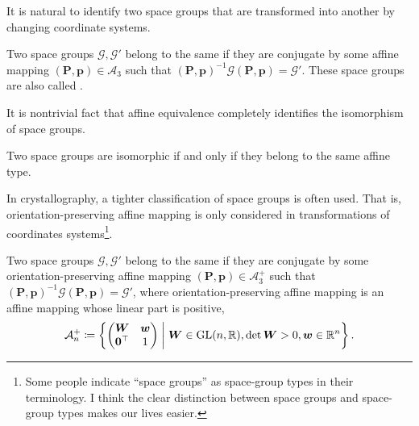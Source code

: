 It is natural to identify two space groups that are transformed into another by changing coordinate systems.

\begin{screen}
  \begin{defn}
    Two space groups $\mathcal{G}, \mathcal{G}'$ belong to the same  if they are conjugate by some affine mapping $(\bm{P}, \bm{p}) \in \mathcal{A}_{3}$ such that $(\bm{P}, \bm{p})^{-1} \mathcal{G} (\bm{P}, \bm{p}) = \mathcal{G}'$.
    These space groups are also called .
  \end{defn}
\end{screen}

It is nontrivial fact that affine equivalence completely identifies the isomorphism of space groups.

\begin{screen}
  \begin{them}[Bieberbach]
    Two space groups are isomorphic if and only if they belong to the same affine type.
  \end{them}
\end{screen}

In crystallography, a tighter classification of space groups is often used.
That is, orientation-preserving affine mapping is only considered in transformations of coordinates systems\footnote{
  Some people indicate ``space groups'' as space-group types in their terminology.
  I think the clear distinction between space groups and space-group types makes our lives easier.
}.

\begin{screen}
  \begin{defn}
    Two space groups $\mathcal{G}, \mathcal{G}'$ belong to the same  if they are conjugate by some orientation-preserving affine mapping $(\bm{P}, \bm{p}) \in \mathcal{A}^{+}_{3}$ such that $(\bm{P}, \bm{p})^{-1} \mathcal{G} (\bm{P}, \bm{p}) = \mathcal{G}'$, where orientation-preserving affine mapping is an affine mapping whose linear part is positive,
    \begin{align}
      \mathcal{A}^{+}_{n} \coloneqq \left\{  \begin{pmatrix} \bm{W} & \bm{w} \\ \bm{0}^{\top} & 1 \end{pmatrix}  \mathrel{}\middle|\mathrel{}  \bm{W} \in \mathrm{GL}(n, \mathbb{R}), \det \bm{W} > 0, \bm{w} \in \mathbb{R}^{n}  \right\}.
    \end{align}
  \end{defn}
\end{screen}

